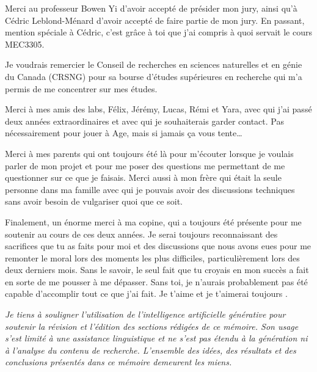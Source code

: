 Merci au professeur Bowen Yi d'avoir accepté de présider mon jury, ainsi qu'à Cédric Leblond-Ménard d'avoir accepté de faire partie de mon jury. En passant, mention spéciale à Cédric, c'est grâce à toi que j'ai compris à quoi servait le cours MEC3305.

Je voudrais remercier le Conseil de recherches en sciences naturelles et en génie du Canada (CRSNG) pour sa bourse d'études supérieures en recherche qui m'a permis de me concentrer sur mes études.

Merci à mes amis des labs, Félix, Jérémy, Lucas, Rémi et Yara, avec qui j'ai passé deux années extraordinaires et avec qui je souhaiterais garder contact. Pas nécessairement pour jouer à Age, mais si jamais ça vous tente\dots

Merci à mes parents qui ont toujours été là pour m'écouter lorsque je voulais parler de mon projet et pour me poser des questions me permettant de me questionner sur ce que je faisais. Merci aussi à mon frère qui était la seule personne dans ma famille avec qui je pouvais avoir des discussions techniques sans avoir besoin de vulgariser quoi que ce soit.

Finalement, un énorme merci à ma copine, qui a toujours été présente pour me soutenir au cours de ces deux années. Je serai toujours reconnaissant des sacrifices que tu as faits pour moi et des discussions que nous avons eues pour me remonter le moral lors des moments les plus difficiles, particulièrement lors des deux derniers mois. Sans le savoir, le seul fait que tu croyais en mon succès a fait en sorte de me pousser à me dépasser. Sans toi, je n'aurais probablement pas été capable d'accomplir tout ce que j'ai fait. Je t'aime et je t'aimerai toujours \cochon.

\vspace{1em}
\noindent\textit{Je tiens à souligner l'utilisation de l'intelligence artificielle générative pour soutenir la révision et l'édition des sections rédigées de ce mémoire. Son usage s'est limité à une assistance linguistique et ne s'est pas étendu à la génération ni à l'analyse du contenu de recherche. L'ensemble des idées, des résultats et des conclusions présentés dans ce mémoire demeurent les miens.}
